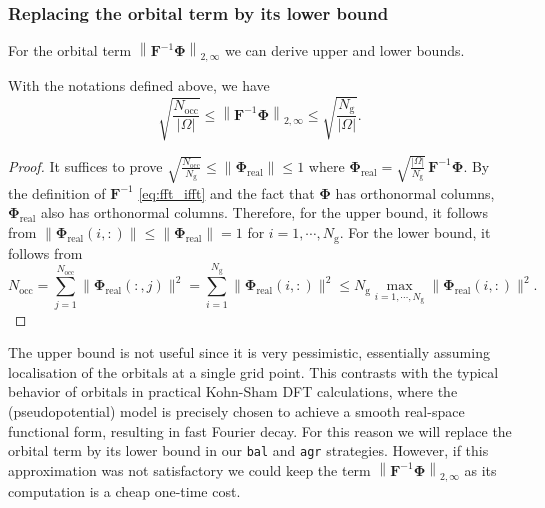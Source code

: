 \documentclass[hidelinks,onefignum,onetabnum]{siamart250211}
\newcommand{\Nocc}{N_{\mathrm{occ}}}
\newcommand{\Ng}{N_{\mathrm{g}}}
\newcommand{\sbal}{\texttt{bal}\xspace}
\newcommand{\sagr}{\texttt{agr}\xspace}
\begin{document}
\subsubsection{Replacing the orbital term by its lower bound}
\label{sec:approx_orbital}
For the orbital term $\left\| \bm{F}^{-1}\bm{\Phi} \right\|_{2,\infty}$ we can derive
upper and lower bounds.
\begin{proposition}\label{prop:FinvPhi_bound}
  With the notations defined above, we have
\begin{equation}
    \sqrt{\frac{\Nocc}{|\Omega|}} \leq \left\| \bm{F}^{-1}\bm{\Phi} \right\|_{2,\infty} \leq \sqrt{\frac{\Ng}{|\Omega|}}.
\end{equation}
\end{proposition}
\begin{proof}
  It suffices to prove
  $\sqrt{\frac{\Nocc}{\Ng}} \leq \left\| \bm\Phi_{\mathrm{real}} \right\| \leq 1$
  where $\bm \Phi_{\mathrm{real}} = \sqrt{\frac{|\Omega|}{\Ng}} \, \bm{F}^{-1}\bm{\Phi}$.
  By the definition of $\bm{F}^{-1}$ \eqref{eq:fft_ifft} and the fact that $\bm
  \Phi$ has orthonormal columns, $\bm \Phi_{\mathrm{real}}$ also has
  orthonormal columns. Therefore, for the upper bound, it follows from
  \linebreak
  $\|\bm{\Phi}_{\mathrm{real}}(i,:)\| \leq \|\bm{\Phi}_{\mathrm{real}}\| = 1$
  for $i=1,\cdots, \Ng$. For the lower bound, it follows from 
  \begin{equation}
    \Nocc = \sum_{j=1}^{\Nocc} \|\bm{\Phi}_{\mathrm{real}}(:,j)\|^2 = \sum_{i=1}^{\Ng} \|\bm{\Phi}_{\mathrm{real}}(i,:)\|^2 \leq \Ng \max_{i=1,\cdots, \Ng} \|\bm{\Phi}_{\mathrm{real}}(i,:)\|^2.
  \end{equation}
\end{proof}
The upper bound is not useful since it is very pessimistic,
essentially assuming localisation of the orbitals at a single grid point.
This contrasts with the typical behavior of orbitals in practical
Kohn-Sham DFT calculations, where the (pseudopotential) model is precisely
chosen to achieve a smooth real-space functional form,
resulting in fast Fourier decay.
For this reason we will replace the orbital term
by its lower bound  in our \sbal and \sagr strategies.
However, if this approximation was not satisfactory
we could keep the term $\left\| \bm{F}^{-1}\bm{\Phi} \right\|_{2,\infty}$
as its computation is a cheap one-time cost.
\end{document}

